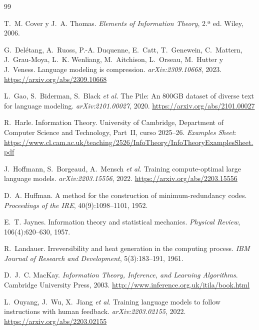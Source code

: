 \begin{thebibliography}{99}
\small

T.~M. Cover y J.~A. Thomas.
\newblock \emph{Elements of Information Theory}, 2.ª ed.
\newblock Wiley, 2006.

G.~Delétang, A.~Ruoss, P.-A. Duquenne, E.~Catt, T.~Genewein, C.~Mattern, J.~Grau-Moya, L.~K. Wenliang, M.~Aitchison, L.~Orseau, M.~Hutter y J.~Veness.
\newblock Language modeling is compression.
\newblock \emph{arXiv:2309.10668}, 2023.
\newblock \url{https://arxiv.org/abs/2309.10668}

L.~Gao, S.~Biderman, S.~Black \emph{et al.}
\newblock The Pile: An 800GB dataset of diverse text for language modeling.
\newblock \emph{arXiv:2101.00027}, 2020.
\newblock \url{https://arxiv.org/abs/2101.00027}

R.~Harle.
\newblock Information Theory.
\newblock University of Cambridge, Department of Computer Science and Technology, Part~II, curso 2025--26.
\newblock \emph{Examples Sheet}: \url{https://www.cl.cam.ac.uk/teaching/2526/InfoTheory/InfoTheoryExamplesSheet.pdf}

J.~Hoffmann, S.~Borgeaud, A.~Mensch \emph{et al.}
\newblock Training compute-optimal large language models.
\newblock \emph{arXiv:2203.15556}, 2022.
\newblock \url{https://arxiv.org/abs/2203.15556}

D.~A. Huffman.
\newblock A method for the construction of minimum-redundancy codes.
\newblock \emph{Proceedings of the IRE}, 40(9):1098--1101, 1952.

E.~T. Jaynes.
\newblock Information theory and statistical mechanics.
\newblock \emph{Physical Review}, 106(4):620--630, 1957.

R.~Landauer.
\newblock Irreversibility and heat generation in the computing process.
\newblock \emph{IBM Journal of Research and Development}, 5(3):183--191, 1961.

D.~J.~C. MacKay.
\newblock \emph{Information Theory, Inference, and Learning Algorithms}.
\newblock Cambridge University Press, 2003.
\newblock \url{http://www.inference.org.uk/itila/book.html}

L.~Ouyang, J.~Wu, X.~Jiang \emph{et al.}
\newblock Training language models to follow instructions with human feedback.
\newblock \emph{arXiv:2203.02155}, 2022.
\newblock \url{https://arxiv.org/abs/2203.02155}


\end{thebibliography}
